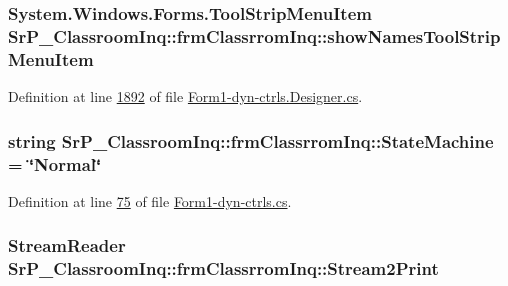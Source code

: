 \hypertarget{class_sr_p___classroom_inq_1_1frm_classrrom_inq_a128944d3506ac87f9278cc8917a9e6f0}{
\subsubsection[{show\-Names\-Tool\-Strip\-Menu\-Item}]{\setlength{\rightskip}{0pt plus 5cm}\-System.\-Windows.\-Forms.\-Tool\-Strip\-Menu\-Item {\bf \-Sr\-P\-\_\-\-Classroom\-Inq\-::frm\-Classrrom\-Inq\-::show\-Names\-Tool\-Strip\-Menu\-Item}}}
\label{class_sr_p___classroom_inq_1_1frm_classrrom_inq_a128944d3506ac87f9278cc8917a9e6f0}


\-Definition at line \hyperlink{_form1-dyn-ctrls_8_designer_8cs_source_l01892}{1892} of file \hyperlink{_form1-dyn-ctrls_8_designer_8cs_source}{\-Form1-\/dyn-\/ctrls.\-Designer.\-cs}.

\hypertarget{class_sr_p___classroom_inq_1_1frm_classrrom_inq_a4858c67d60a267f02e6c97085f2aee71}{
\subsubsection[{\-State\-Machine}]{\setlength{\rightskip}{0pt plus 5cm}string {\bf \-Sr\-P\-\_\-\-Classroom\-Inq\-::frm\-Classrrom\-Inq\-::\-State\-Machine} = \char`\"{}\-Normal\char`\"{}}}
\label{class_sr_p___classroom_inq_1_1frm_classrrom_inq_a4858c67d60a267f02e6c97085f2aee71}


\-Definition at line \hyperlink{_form1-dyn-ctrls_8cs_source_l00075}{75} of file \hyperlink{_form1-dyn-ctrls_8cs_source}{\-Form1-\/dyn-\/ctrls.\-cs}.

\hypertarget{class_sr_p___classroom_inq_1_1frm_classrrom_inq_aa030f46a7915eae3a0b8b88661be51a8}{
\subsubsection[{\-Stream2\-Print}]{\setlength{\rightskip}{0pt plus 5cm}\-Stream\-Reader {\bf \-Sr\-P\-\_\-\-Classroom\-Inq\-::frm\-Classrrom\-Inq\-::\-Stream2\-Print}}}
\label{class_sr_p___classroom_inq_1_1frm_classrrom_inq_aa030f46a7915eae3a0b8b88661be51a8}


